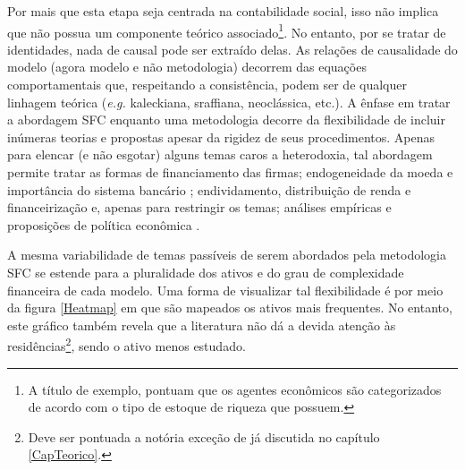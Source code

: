 Por mais que esta etapa seja centrada na contabilidade social, isso não implica que não possua um componente teórico associado\footnote{A título de exemplo, \textcite[p.~15--16]{macedo_e_silva_peering_2011}  pontuam que %
	os agentes econômicos são categorizados de acordo com o tipo de estoque de riqueza que possuem.
}. 
No entanto, por se tratar de identidades, nada de causal pode ser extraído delas. As relações de causalidade do modelo (agora modelo e não metodologia) decorrem das equações comportamentais que, respeitando a consistência, podem ser de qualquer linhagem teórica (\textit{e.g.} kaleckiana, sraffiana, neoclássica, etc.). A ênfase em tratar a abordagem SFC enquanto uma metodologia decorre da flexibilidade de incluir inúmeras teorias e propostas apesar da rigidez de seus procedimentos. Apenas para elencar (e não esgotar) alguns temas caros a heterodoxia, tal abordagem permite tratar as formas de financiamento das firmas; endogeneidade da moeda e importância do sistema bancário \cites{godley_money_1999}{lavoie_note_1999}; endividamento, distribuição de renda e financeirização \cites{palley_inside_1996}{wolfson_irving_1996}{palley_money_1997}{palley_financial_2002}{dos_santos_revisiting_2009}{palley_inside_2010}{hein_finance-dominated_2012} e, apenas para restringir os temas; análises empíricas e proposições de política econômica \cites{godley_seven_1999}{godley_fiscal_2007}{godley_simple_2007}{arestis_income_2011}. 

A mesma variabilidade de temas passíveis de serem abordados pela metodologia SFC se estende para a pluralidade dos ativos e do grau de complexidade financeira de cada modelo. Uma forma de visualizar tal flexibilidade é por meio da figura \ref{Heatmap} em que são mapeados os ativos mais frequentes. No entanto, este gráfico também revela que a literatura não dá a devida atenção às residências\footnote{Deve ser pontuada a notória exceção de \textcite{zezza_u.s._2008} já discutida no capítulo \ref{CapTeorico}.}, sendo o ativo menos estudado. 


